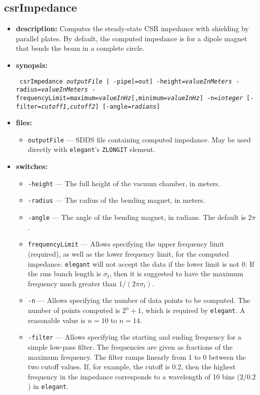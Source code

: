 \documentclass[11pt]{article}
\begin{document}
\subsection{csrImpedance}

\begin{itemize}
\item {\bf description:}  Computes the steady-state CSR impedance with shielding by parallel plates.
By default, the computed impedance is for a dipole magnet that bends the beam in a complete circle.

\item {\bf synopsis:}
\begin{flushleft}{\tt
csrImpedance {{\em outputFile}  | -pipe[=out]} -height={\em valueInMeters} -radius={\em valueInMeters}
-frequencyLimit=maximum={\em valueInHz}[,minimum={\em valueInHz}] -n={\em integer} [-filter={\em cutoff1},{\em cutoff2}]
[-angle={\em radians}]
}\end{flushleft}

\item {\bf files:}
\begin{itemize}
\item {\tt outputFile} --- SDDS file containing computed impedance.  May be used directly with 
{\tt elegant}'s \verb|ZLONGIT| element.
\end{itemize}

\item {\bf switches:}
\begin{itemize}
\item {\tt -height} --- The full height of the vacuum chamber, in meters.
\item {\tt -radius} --- The radius of the bending magnet, in meters.
\item {\tt -angle} --- The angle of the bending magnet, in radians.  The default is $2\pi$.
\item {\tt frequencyLimit} --- Allows specifying the upper frequency limit (required), as well as the
 lower frequency limit, for the computed impedance.  {\tt elegant} will not accept the data if the lower
 limit is not 0.  If the rms bunch length is $\sigma_t$, then it is suggested to have the maximum frequency 
 much greater than $1/(2\pi\sigma_t)$.
\item {\tt -n} --- Allows specifying the number of data points to be computed. The number of points computed
 is $2^n+1$, which is required by {\tt elegant}.  A reasonable value is $n=10$ to $n=14$.
\item {\tt -filter} --- Allows specifying the starting and ending frequency for a simple low-pass filter.
 The frequencies are given as fractions of the maximum frequency.  The filter ramps linearly from 1 to 0
 between the two cutoff values.  If, for example, the cutoff is 0.2, then the highest frequency
 in the impedance corresponds to a wavelength of 10 bins ($2/0.2$) in {\tt elegant}.
\end{itemize}


\end{itemize}
\end{document}
